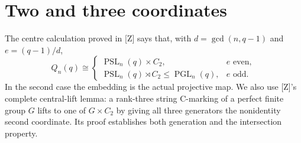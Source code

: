 \documentclass[11pt,a4paper]{article}
\newcommand{\PGL}{\operatorname{PGL}}
\newcommand{\PSL}{\operatorname{PSL}}
\begin{document}
\section{Two and three coordinates}
The centre calculation proved in [Z] says that, with
$d=\gcd(n,q-1)$ and $e=(q-1)/d$,
\[
 Q_n(q)\cong
 \begin{cases}
 \PSL_n(q)\times C_2,&e\text{ even},\\
 \PSL_n(q)\rtimes C_2\le\PGL_n(q),&e\text{ odd}.
 \end{cases}                                            \tag{1}
\]
In the second case the embedding is the actual projective map.
We also use [Z]'s complete central-lift lemma: a rank-three string
C-marking of a perfect finite group $G$ lifts to one of $G\times C_2$
by giving all three generators the nonidentity second coordinate.
Its proof establishes both generation and the intersection property.
\end{document}
